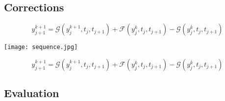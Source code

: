 \subsection{Corrections}

\begin{frame}
\begin{equation*}
y_{j+1}^{k+1} = \mathcal{G}\!\!\left(y_j^{k+1}, t_j, t_{j+1}\right) + \mathcal{F}\!\!\left(y_j^k, t_j, t_{j+1}\right) - \mathcal{G}\!\!\left(y_j^k, t_j, t_{j+1}\right)
\end{equation*}
\end{frame}

\begin{frame}
\begin{center}
\texttt{[image: sequence.jpg]}
\end{center}
\begin{equation*}
y_{j+1}^{k+1} = \mathcal{G}\!\!\left(y_j^{k+1}, t_j, t_{j+1}\right) + \mathcal{F}\!\!\left(y_j^k, t_j, t_{j+1}\right) - \mathcal{G}\!\!\left(y_j^k, t_j, t_{j+1}\right)
\end{equation*}
\end{frame}

\subsection{Evaluation}

\begin{frame}
\begin{center}
\scalebox{0.65}{}
\end{center}
\end{frame}

\begin{frame}
\begin{center}
\scalebox{0.65}{}
\end{center}
\end{frame}



\begin{frame}
\begin{center}
\scalebox{0.65}{}
\end{center}
\end{frame}

\begin{frame}
\begin{center}
\scalebox{0.65}{}
\end{center}
\end{frame}


